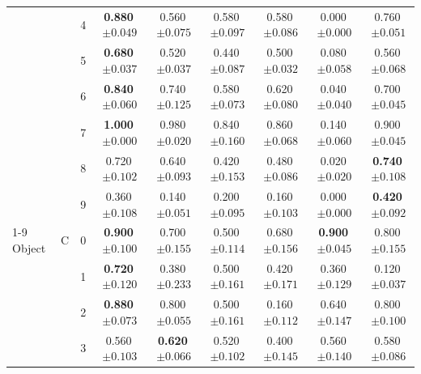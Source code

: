 \begin{longtable}{lllcccccc}
 &  & 4 & \textbf{0.880}$\,{\scriptstyle\pm0.049}$ & 0.560$\,{\scriptstyle\pm0.075}$ & 0.580$\,{\scriptstyle\pm0.097}$ & 0.580$\,{\scriptstyle\pm0.086}$ & 0.000$\,{\scriptstyle\pm0.000}$ & 0.760$\,{\scriptstyle\pm0.051}$ \\
 &  & 5 & \textbf{0.680}$\,{\scriptstyle\pm0.037}$ & 0.520$\,{\scriptstyle\pm0.037}$ & 0.440$\,{\scriptstyle\pm0.087}$ & 0.500$\,{\scriptstyle\pm0.032}$ & 0.080$\,{\scriptstyle\pm0.058}$ & 0.560$\,{\scriptstyle\pm0.068}$ \\
 &  & 6 & \textbf{0.840}$\,{\scriptstyle\pm0.060}$ & 0.740$\,{\scriptstyle\pm0.125}$ & 0.580$\,{\scriptstyle\pm0.073}$ & 0.620$\,{\scriptstyle\pm0.080}$ & 0.040$\,{\scriptstyle\pm0.040}$ & 0.700$\,{\scriptstyle\pm0.045}$ \\
 &  & 7 & \textbf{1.000}$\,{\scriptstyle\pm0.000}$ & 0.980$\,{\scriptstyle\pm0.020}$ & 0.840$\,{\scriptstyle\pm0.160}$ & 0.860$\,{\scriptstyle\pm0.068}$ & 0.140$\,{\scriptstyle\pm0.060}$ & 0.900$\,{\scriptstyle\pm0.045}$ \\
 &  & 8 & 0.720$\,{\scriptstyle\pm0.102}$ & 0.640$\,{\scriptstyle\pm0.093}$ & 0.420$\,{\scriptstyle\pm0.153}$ & 0.480$\,{\scriptstyle\pm0.086}$ & 0.020$\,{\scriptstyle\pm0.020}$ & \textbf{0.740}$\,{\scriptstyle\pm0.108}$ \\
 &  & 9 & 0.360$\,{\scriptstyle\pm0.108}$ & 0.140$\,{\scriptstyle\pm0.051}$ & 0.200$\,{\scriptstyle\pm0.095}$ & 0.160$\,{\scriptstyle\pm0.103}$ & 0.000$\,{\scriptstyle\pm0.000}$ & \textbf{0.420}$\,{\scriptstyle\pm0.092}$ \\
\cmidrule(lr){1-9}
Object & C & 0 & \textbf{0.900}$\,{\scriptstyle\pm0.100}$ & 0.700$\,{\scriptstyle\pm0.155}$ & 0.500$\,{\scriptstyle\pm0.114}$ & 0.680$\,{\scriptstyle\pm0.156}$ & \textbf{0.900}$\,{\scriptstyle\pm0.045}$ & 0.800$\,{\scriptstyle\pm0.155}$ \\
 &  & 1 & \textbf{0.720}$\,{\scriptstyle\pm0.120}$ & 0.380$\,{\scriptstyle\pm0.233}$ & 0.500$\,{\scriptstyle\pm0.161}$ & 0.420$\,{\scriptstyle\pm0.171}$ & 0.360$\,{\scriptstyle\pm0.129}$ & 0.120$\,{\scriptstyle\pm0.037}$ \\
 &  & 2 & \textbf{0.880}$\,{\scriptstyle\pm0.073}$ & 0.800$\,{\scriptstyle\pm0.055}$ & 0.500$\,{\scriptstyle\pm0.161}$ & 0.160$\,{\scriptstyle\pm0.112}$ & 0.640$\,{\scriptstyle\pm0.147}$ & 0.800$\,{\scriptstyle\pm0.100}$ \\
 &  & 3 & 0.560$\,{\scriptstyle\pm0.103}$ & \textbf{0.620}$\,{\scriptstyle\pm0.066}$ & 0.520$\,{\scriptstyle\pm0.102}$ & 0.400$\,{\scriptstyle\pm0.145}$ & 0.560$\,{\scriptstyle\pm0.140}$ & 0.580$\,{\scriptstyle\pm0.086}$ \\

\end{longtable}
